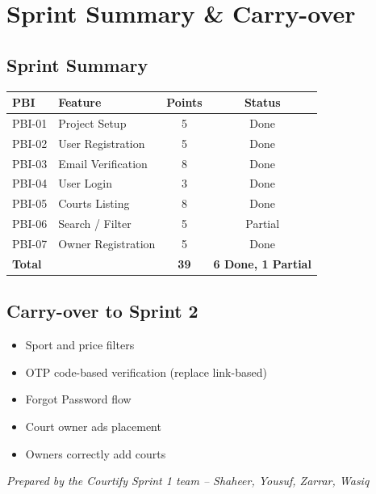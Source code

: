 \documentclass[12pt,a4paper]{article}
\begin{document}
\vspace{2em}

\section{Sprint Summary \& Carry-over}

\subsection*{Sprint Summary}
\renewcommand{\arraystretch}{1.4}
\begin{tabularx}{\textwidth}{|l|X|c|c|}
\hline
\rowcolor{headerbg}\color{white}\bfseries PBI & \color{white}\bfseries Feature & \color{white}\bfseries Points & \color{white}\bfseries Status \\ \hline
PBI-01 & Project Setup & 5 & Done \\ \hline
\rowcolor{rowgray} PBI-02 & User Registration & 5 & Done \\ \hline
PBI-03 & Email Verification & 8 & Done \\ \hline
\rowcolor{rowgray} PBI-04 & User Login & 3 & Done \\ \hline
PBI-05 & Courts Listing & 8 & Done \\ \hline
\rowcolor{rowgray} PBI-06 & Search / Filter & 5 & Partial \\ \hline
PBI-07 & Owner Registration & 5 & Done \\ \hline
\rowcolor{headerbg}\color{white}\bfseries Total & & \color{white}\bfseries 39 & \color{white}\bfseries 6 Done, 1 Partial \\ \hline
\end{tabularx}

\vspace{1.5em}

\subsection*{Carry-over to Sprint 2}
\begin{itemize}
    \item Sport and price filters
    \item OTP code-based verification (replace link-based)
    \item Forgot Password flow
    \item Court owner ads placement
    \item Owners correctly add courts
\end{itemize}

\vspace{2cm}
\begin{center}
\textit{Prepared by the Courtify Sprint 1 team -- Shaheer, Yousuf, Zarrar, Wasiq}
\end{center}
\end{document}
